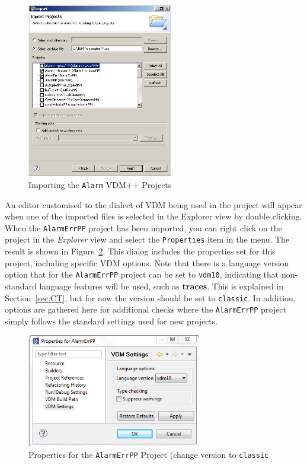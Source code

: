 %
\begin{figure}[!htb]
\begin{center}
  \includegraphics[width=2.5in]{figures/importalarmprofs}
  \caption[labelInTOC]{Importing the \texttt{Alarm} VDM++ Projects}
  \label{fig:importalarm}
\end{center}
\end{figure}
%
An editor customised to the dialect of VDM being used in the project will appear when one of the imported files is selected in the Explorer view by double clicking. When the
\texttt{AlarmErrPP} project has been imported, you can right click on the project in the \emph{Explorer} view and select the \texttt{Properties} item in the menu.  The result is shown in Figure~\ref{fig:settings}. This dialog includes the properties set for this project, including specific VDM options. Note that there is a language version option that for the \texttt{AlarmErrPP} project can be set to \texttt{vdm10}, indicating that non-standard language features will be used, such as {\bf\ttfamily traces}.  This is explained in Section~\ref{sec:CT}, but for now the version should be set to \texttt{classic}. In addition, options are gathered here for additional checks where the \texttt{AlarmErrPP} project simply follows the standard settings used for new projects.
%
\begin{figure}[!htb]
\begin{center}
  \includegraphics[width=3.0in]{figures/settings}
  \caption[labelInTOC]{Properties for the \texttt{AlarmErrPP} Project (change version to \texttt{classic}}
  \label{fig:settings}
\end{center}
\end{figure}

